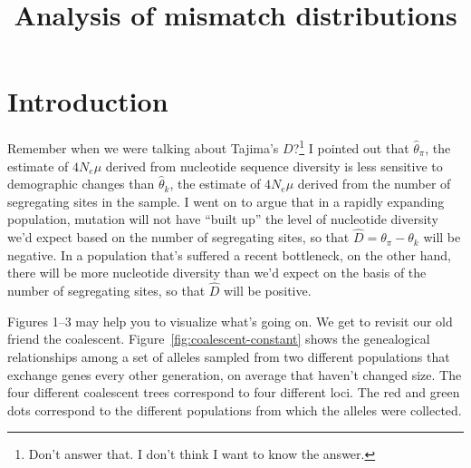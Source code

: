 \documentclass[12pt]{article}
\title{Analysis of mismatch distributions}
\begin{document}
\maketitle

\thispagestyle{first}

\section*{Introduction}

Remember when we were talking about Tajima's $D$?\footnote{Don't
  answer that. I don't think I want to know the answer.} I pointed out
that $\hat \theta_\pi$, the estimate of $4N_e\mu$ derived from
nucleotide sequence diversity is less sensitive to demographic changes
than $\hat \theta_k$, the estimate of $4N_e\mu$ derived from the
number of segregating sites in the sample. I went on to argue that in
a rapidly expanding population, mutation will not have ``built up''
the level of nucleotide diversity we'd expect based on the number of
segregating sites, so that $\hat D = \theta_\pi - \theta_k$ will be
negative. In a population that's suffered a recent bottleneck, on the
other hand, there will be more nucleotide diversity than we'd expect
on the basis of the number of segregating sites, so that $\hat D$ will
be positive.

Figures 1--3 may help you to visualize what's going on. We get to
revisit our old friend the
coalescent. Figure~\ref{fig:coalescent-constant} shows the genealogical
relationships among a set of alleles sampled from two different
populations that exchange genes every other generation, on average
that haven't changed size. The four different coalescent trees
correspond to four different loci. The red and green dots correspond
to the different populations from which the alleles were collected.
\end{document}
